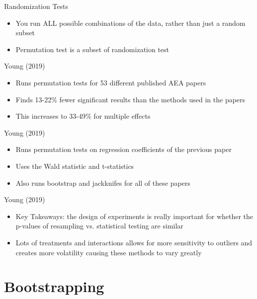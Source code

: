\begin{frame}{Randomization Tests}
    \begin{itemize}
        \item You run ALL possible combinations of the data, rather than just a random subset
        \item Permutation test is a subset of randomization test
    \end{itemize}
\end{frame}

\begin{frame}{Young (2019)}
    \begin{itemize}
        \item Runs permutation tests for 53 different published AEA papers
        \item Finds 13-22\% fewer significant results than the methods used in the papers
        \item This increases to 33-49\% for multiple effects
    \end{itemize}
\end{frame}

\begin{frame}{Young (2019)}
    \begin{itemize}
        \item Runs permutation tests on regression coefficients of the previous paper
        \item Uses the Wald statistic and t-statistics
        \item Also runs bootstrap and jackknifes for all of these papers
    \end{itemize}
\end{frame}

\begin{frame}{Young (2019)}
    \begin{itemize}
        \item Key Takeaways: the design of experiments is really important for whether the p-values of resampling vs. statistical testing are similar
        \item Lots of treatments and interactions allows for more sensitivity to outliers and creates more volatility causing these methods to vary greatly
    \end{itemize}
\end{frame}







\section{Bootstrapping}

